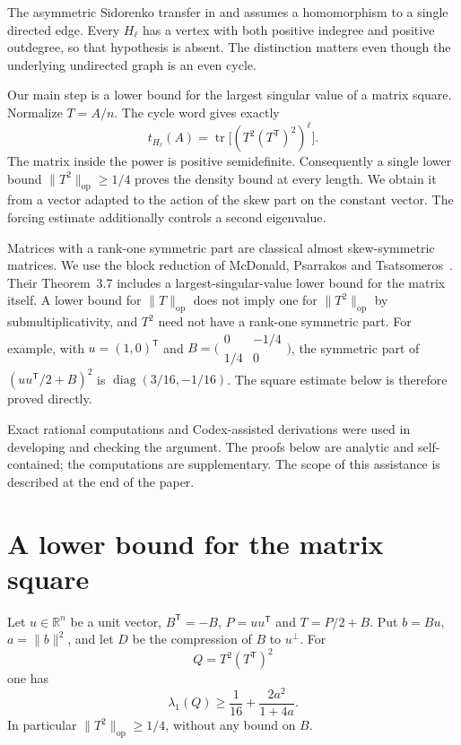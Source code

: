 \documentclass[acmsmall,screen,nonacm,11pt]{acmart}
\newcommand{\R}{\mathbb R}
\newcommand{\op}{\mathrm{op}}
\newcommand{\tr}{\operatorname{tr}}
\newcommand{\diag}{\operatorname{diag}}
\newcommand{\norm}[1]{\lVert #1\rVert}
\begin{document}
The asymmetric Sidorenko transfer in \cite[Theorem~1.5]{FHMZ22} and \cite[Theorem~4.2]{FHMZ24} assumes a homomorphism to a single directed edge. Every $H_\ell$ has a vertex with both positive indegree and positive outdegree, so that hypothesis is absent. The distinction matters even though the underlying undirected graph is an even cycle.

Our main step is a lower bound for the largest singular value of a matrix square. Normalize $T=A/n$. The cycle word gives exactly
\[
 t_{H_\ell}(A)=\tr\bigl[(T^2(T^{\mathsf T})^2)^\ell\bigr].
\]
The matrix inside the power is positive semidefinite. Consequently a single lower bound $\norm{T^2}_{\op}\geq1/4$ proves the density bound at every length. We obtain it from a vector adapted to the action of the skew part on the constant vector. The forcing estimate additionally controls a second eigenvalue.

Matrices with a rank-one symmetric part are classical almost skew-symmetric matrices. We use the block reduction of McDonald, Psarrakos and Tsatsomeros~\cite[Equation~(3.2)]{MPT04}. Their Theorem~3.7 includes a largest-singular-value lower bound for the matrix itself. A lower bound for $\norm{T}_{\op}$ does not imply one for $\norm{T^2}_{\op}$ by submultiplicativity, and $T^2$ need not have a rank-one symmetric part. For example, with $u=(1,0)^{\mathsf T}$ and $B=\bigl(\begin{smallmatrix}0&-1/4\\1/4&0\end{smallmatrix}\bigr)$, the symmetric part of $(uu^{\mathsf T}/2+B)^2$ is $\diag(3/16,-1/16)$. The square estimate below is therefore proved directly.

Exact rational computations and Codex-assisted derivations were used in developing and checking the argument. The proofs below are analytic and self-contained; the computations are supplementary. The scope of this assistance is described at the end of the paper.

\section{A lower bound for the matrix square}

\begin{lemma}\label{lem:square}
Let $u\in\R^n$ be a unit vector, $B^{\mathsf T}=-B$, $P=uu^{\mathsf T}$ and $T=P/2+B$. Put $b=Bu$, $a=\norm{b}^2$, and let $D$ be the compression of $B$ to $u^\perp$. For
\[
 Q=T^2(T^{\mathsf T})^2
\]
one has
\begin{equation}\label{eq:lambda1}
 \lambda_1(Q)\geq \frac1{16}+\frac{2a^2}{1+4a}.
\end{equation}
In particular $\norm{T^2}_{\op}\geq1/4$, without any bound on $B$.
\end{lemma}
\end{document}
